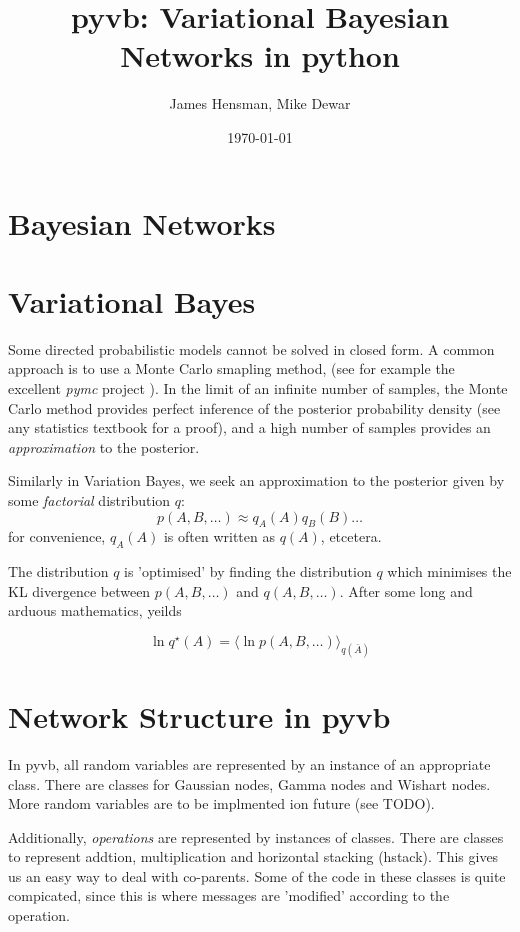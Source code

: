 \documentclass{article}
\title{pyvb: Variational Bayesian Networks in python}
\author{James Hensman, Mike Dewar}
\date{\today}
\newcommand{\qs}{q^\star}
\newcommand{\<}{\langle}
\renewcommand{\>}{\rangle}
\begin{document}
\maketitle

\section{Bayesian Networks}
\section{Variational Bayes}
Some directed probabilistic models cannot be solved in closed form. A common approach is to use a Monte Carlo smapling method, (see for example the excellent {\em pymc} project \cite{pymc}).  In the limit of an infinite number of samples, the Monte Carlo method provides perfect inference of the posterior probability density (see any statistics textbook for a proof), and a high number of samples provides an {\em approximation} to the posterior.  

Similarly in Variation Bayes, we seek an approximation to the posterior given by some {\em factorial} distribution $q$:
\begin{equation}
p(A,B,\ldots) \approx q_A(A) q_B(B) \ldots
\end{equation}
for convenience, $q_A(A)$ is often written as $q(A)$, etcetera. 

The distribution $q$ is 'optimised' by finding the distribution $q$ which minimises the KL divergence between $p(A,B,\ldots)$ and $q(A,B,\ldots)$.  After some long and arduous mathematics, \citet{Bishop2006prm} yeilds

\begin{equation}
\ln \qs(A) = \< \ln p(A,B,\ldots)\>_{q(\bar A)}
\label{eq:basic_VB_update}
\end{equation}
\section{Network Structure in pyvb}
In pyvb, all random variables are represented by an instance of an appropriate class. There are classes for Gaussian nodes, Gamma nodes and Wishart nodes. More random variables are to be implmented ion future (see TODO).

Additionally, {\em operations} are represented by instances of classes. There are classes to represent addtion, multiplication and horizontal stacking (hstack).  This gives us an easy way to deal with co-parents.  Some of the code in these classes is quite compicated, since this is where messages are 'modified' according to the operation. 
\end{document}
